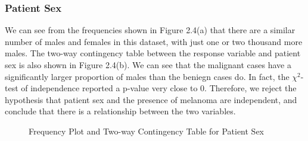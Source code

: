 \documentclass [MAS] {uclathes}
\begin{document}
\subsubsection*{Patient Sex}

We can see from the frequencies shown in Figure 2.4(a) that there are a similar number of males and females in this dataset, with just one or two thousand more males. The two-way contingency table between the response variable and patient sex is also shown in Figure 2.4(b). We can see that the malignant cases have a significantly larger proportion of males than the beniegn cases do. In fact, the $\chi^2$-test of independence reported a p-value very close to 0. Therefore, we reject the hypothesis that patient sex and the presence of melanoma are independent, and conclude that there is a relationship between the two variables.

\begin{figure}[h!tbp]
    \hspace*{\fill}
    \centering
    \hspace{1em}
    \hspace*{\fill}
    \label{fig:sex_eda}
    \vspace{0cm}
    \caption{Frequency Plot and Two-way Contingency Table for Patient Sex}
    \end{figure}
\end{document}
